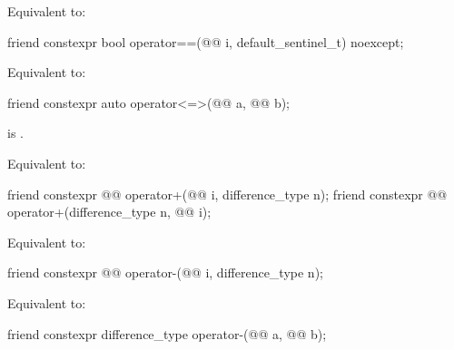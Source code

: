 \begin{wgText}[{[simd]}]
\begin{itemdescr}
  \pnum
  \effects
  Equivalent to: 
\end{itemdescr}

\begin{itemdecl}
  friend constexpr bool operator==(@@ i, default_sentinel_t) noexcept;
\end{itemdecl}

\begin{itemdescr}
  \pnum
  \effects
  Equivalent to: 
\end{itemdescr}

\begin{itemdecl}
  friend constexpr auto operator<=>(@@ a, @@ b);
\end{itemdecl}

\begin{itemdescr}
  \pnum
  \expects
   is .

  \pnum
  \effects
  Equivalent to: 
\end{itemdescr}

\begin{itemdecl}
  friend constexpr @@ operator+(@@ i, difference_type n);
  friend constexpr @@ operator+(difference_type n, @@ i);
\end{itemdecl}

\begin{itemdescr}
\pnum
\effects
Equivalent to: 
\end{itemdescr}

\begin{itemdecl}
friend constexpr @@ operator-(@@ i, difference_type n);
\end{itemdecl}

\begin{itemdescr}
\pnum
\effects
Equivalent to: 
\end{itemdescr}

\begin{itemdecl}
friend constexpr difference_type operator-(@@ a, @@ b);
\end{itemdecl}


\end{wgText}
